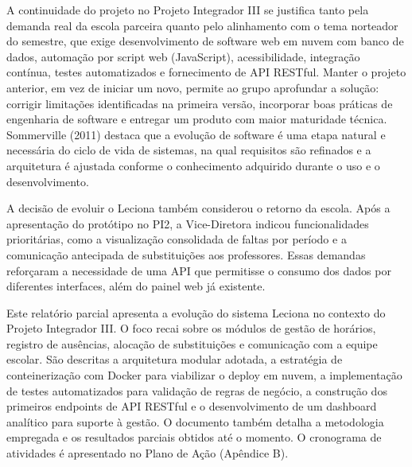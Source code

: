A continuidade do projeto no Projeto Integrador III se justifica tanto pela demanda real da escola parceira quanto pelo alinhamento com o tema norteador do semestre, que exige desenvolvimento de software web em nuvem com banco de dados, automação por script web (JavaScript), acessibilidade, integração contínua, testes automatizados e fornecimento de API RESTful. Manter o projeto anterior, em vez de iniciar um novo, permite ao grupo aprofundar a solução: corrigir limitações identificadas na primeira versão, incorporar boas práticas de engenharia de software e entregar um produto com maior maturidade técnica. Sommerville (2011) destaca que a evolução de software é uma etapa natural e necessária do ciclo de vida de sistemas, na qual requisitos são refinados e a arquitetura é ajustada conforme o conhecimento adquirido durante o uso e o desenvolvimento.

A decisão de evoluir o Leciona também considerou o retorno da escola. Após a apresentação do protótipo no PI2, a Vice-Diretora indicou funcionalidades prioritárias, como a visualização consolidada de faltas por período e a comunicação antecipada de substituições aos professores. Essas demandas reforçaram a necessidade de uma API que permitisse o consumo dos dados por diferentes interfaces, além do painel web já existente.

Este relatório parcial apresenta a evolução do sistema Leciona no contexto do Projeto Integrador III. O foco recai sobre os módulos de gestão de horários, registro de ausências, alocação de substituições e comunicação com a equipe escolar. São descritas a arquitetura modular adotada, a estratégia de conteinerização com Docker para viabilizar o deploy em nuvem, a implementação de testes automatizados para validação de regras de negócio, a construção dos primeiros endpoints de API RESTful e o desenvolvimento de um dashboard analítico para suporte à gestão. O documento também detalha a metodologia empregada e os resultados parciais obtidos até o momento. O cronograma de atividades é apresentado no Plano de Ação (Apêndice B).

